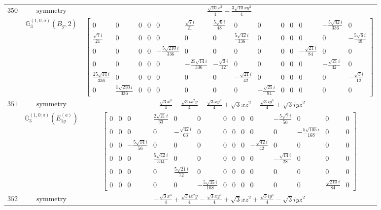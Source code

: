 \documentclass[fleqn,8pt,landscape]{jsarticle}
\begin{document}
\begin{longtable}{ccc}
$ 350 $ & $ \text{symmetry} $ & $ \frac{\sqrt{10} x^{3}}{4} - \frac{3 \sqrt{10} x y^{2}}{4} $ \\
$  $ & $ \mathbb{G}_{3}^{(1,0;a)}(B_{g},2) $ & $ \begin{bmatrix} 0 & 0 & 0 & 0 & 0 & \frac{\sqrt{7} i}{21} & \frac{5 \sqrt{6} i}{48} & 0 & 0 & 0 & 0 & 0 & - \frac{5 \sqrt{42} i}{336} & 0 \\ \frac{\sqrt{7} i}{21} & 0 & 0 & 0 & 0 & 0 & 0 & \frac{5 \sqrt{42} i}{336} & 0 & 0 & 0 & 0 & 0 & - \frac{5 \sqrt{6} i}{48} \\ 0 & 0 & 0 & 0 & - \frac{5 \sqrt{210} i}{336} & 0 & 0 & 0 & 0 & 0 & 0 & - \frac{\sqrt{21} i}{84} & 0 & 0 \\ 0 & 0 & 0 & 0 & 0 & - \frac{25 \sqrt{14} i}{336} & - \frac{\sqrt{3} i}{12} & 0 & 0 & 0 & 0 & 0 & - \frac{\sqrt{21} i}{42} & 0 \\ \frac{25 \sqrt{14} i}{336} & 0 & 0 & 0 & 0 & 0 & 0 & - \frac{\sqrt{21} i}{42} & 0 & 0 & 0 & 0 & 0 & - \frac{\sqrt{3} i}{12} \\ 0 & \frac{5 \sqrt{210} i}{336} & 0 & 0 & 0 & 0 & 0 & 0 & - \frac{\sqrt{21} i}{84} & 0 & 0 & 0 & 0 & 0 \end{bmatrix} $ \\ \hline
$ 351 $ & $ \text{symmetry} $ & $ - \frac{\sqrt{3} x^{3}}{4} - \frac{\sqrt{3} i x^{2} y}{4} - \frac{\sqrt{3} x y^{2}}{4} + \sqrt{3} x z^{2} - \frac{\sqrt{3} i y^{3}}{4} + \sqrt{3} i y z^{2} $ \\
$  $ & $ \mathbb{G}_{3}^{(1,0;a)}(E_{1g}^{(a)}) $ & $ \begin{bmatrix} 0 & 0 & 0 & \frac{2 \sqrt{21} i}{63} & 0 & 0 & 0 & 0 & 0 & 0 & - \frac{5 \sqrt{7} i}{56} & 0 & 0 & 0 \\ 0 & 0 & 0 & 0 & - \frac{\sqrt{42} i}{63} & 0 & 0 & 0 & 0 & 0 & 0 & - \frac{5 \sqrt{105} i}{168} & 0 & 0 \\ 0 & 0 & - \frac{5 \sqrt{14} i}{56} & 0 & 0 & 0 & 0 & 0 & 0 & - \frac{\sqrt{42} i}{42} & 0 & 0 & 0 & 0 \\ 0 & 0 & 0 & \frac{5 \sqrt{42} i}{504} & 0 & 0 & 0 & 0 & 0 & 0 & - \frac{\sqrt{14} i}{28} & 0 & 0 & 0 \\ 0 & 0 & 0 & 0 & \frac{5 \sqrt{21} i}{72} & 0 & 0 & 0 & 0 & 0 & 0 & 0 & 0 & 0 \\ 0 & 0 & 0 & 0 & 0 & - \frac{5 \sqrt{35} i}{168} & 0 & 0 & 0 & 0 & 0 & 0 & \frac{\sqrt{210} i}{84} & 0 \end{bmatrix} $ \\ \hline
$ 352 $ & $ \text{symmetry} $ & $ - \frac{\sqrt{3} x^{3}}{4} + \frac{\sqrt{3} i x^{2} y}{4} - \frac{\sqrt{3} x y^{2}}{4} + \sqrt{3} x z^{2} + \frac{\sqrt{3} i y^{3}}{4} - \sqrt{3} i y z^{2} $ \\

\end{longtable}
\end{document}
